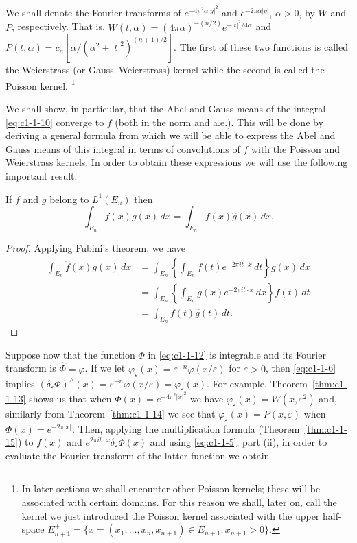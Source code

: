 We shall denote the Fourier transforms of $e^{-4\pi^{2}\alpha|y|^{2}}$ and
$e^{-2\pi\alpha|y|}$, $\alpha > 0$, by $W$ and $P$, respectively. That is,
$W(t, \alpha) = (4\pi\alpha)^{-(n/2)}e^{-|t|^{2}/4\alpha}$ and
$P(t, \alpha) = c_{n}[\alpha/(\alpha^{2} + |t|^{2})^{(n+1)/2}]$. The first of
these two functions is called the Weierstrass (or Gauss--Weierstrass) kernel
while the second is called the Poisson kernel.%
\footnote{In later sections we shall encounter other Poisson kernels; these
will be associated with certain domains. For this reason we shall, later on,
call the kernel we just introduced the Poisson kernel associated with the upper
half-space
$E_{n+1}^{+}=\{x=(x_{1},\ldots,x_{n},x_{n+1})\in E_{n+1};x_{n+1}>0\}$.}

We shall show, in particular, that the Abel and Gauss means of the integral
\eqref{eq:c1-1-10} converge to $f$ (both in the norm and a.e.). This will be
done by deriving a general formula from which we will be able to express the
Abel and Gauss means of this integral in terms of convolutions of $f$ with the
Poisson and Weierstrass kernels. In order to obtain these expressions we will
use the following important result.

\begin{theorem}\label{thm:c1-1-15}
If $f$ and $g$ belong to $L^{1}(E_{n})$ then
\[
\int_{E_{n}}\hat{f}(x)g(x)\,dx=\int_{E_{n}}f(x)\hat{g}(x)\,dx.
\]
\end{theorem}

\begin{proof}
Applying Fubini's theorem, we have
\begin{align*}
\int_{E_{n}}\hat{f}(x)g(x)\,dx
&=\int_{E_{n}}\left\{\int_{E_{n}}f(t)e^{-2\pi i t\cdot x}\,dt\right\}g(x)\,dx\\
&=\int_{E_{n}}\left\{\int_{E_{n}}g(x)e^{-2\pi i t\cdot x}\,dx\right\}f(t)\,dt\\
&=\int_{E_{n}}f(t)\hat{g}(t)\,dt.
\end{align*}
\end{proof}

Suppose now that the function $\Phi$ in \eqref{eq:c1-1-12} is integrable and its
Fourier transform is $\hat{\Phi} = \varphi$. If we let
$\varphi_{\varepsilon}(x) = \varepsilon^{-n}\varphi(x/\varepsilon)$ for
$\varepsilon > 0$, then \eqref{eq:c1-1-6} implies
$(\delta_{\varepsilon}\Phi)^{\wedge}(x) = \varepsilon^{-n}\varphi(x/\varepsilon) = \varphi_{\varepsilon}(x)$.
For example, Theorem~\ref{thm:c1-1-13} shows us that when
$\Phi(x) = e^{-4\pi^{2}|x|^{2}}$ we have
$\varphi_{\varepsilon}(x) = W(x, \varepsilon^{2})$ and, similarly from
Theorem~\ref{thm:c1-1-14} we see that $\varphi_{\varepsilon}(x) = P(x, \varepsilon)$
when $\Phi(x) = e^{-2\pi|x|}$. Then, applying the multiplication formula
(Theorem~\ref{thm:c1-1-15}) to $f(x)$ and
$e^{2\pi i t \cdot x} \delta_{\varepsilon}\Phi(x)$ and using \eqref{eq:c1-1-5},
part (ii), in order to evaluate the Fourier transform of the latter function we
obtain

